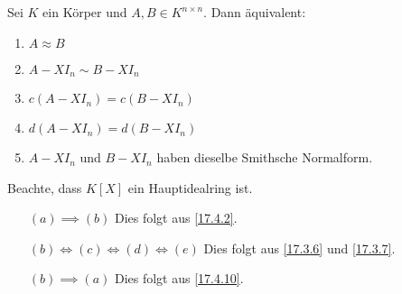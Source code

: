 \documentclass[../../main.tex]{subfiles}
\begin{document}
\begin{kor}\label{17.4.11}
    Sei $K$ ein Körper und $A,B\in K^{n\times n}$. Dann äquivalent:
    \begin{enumerate}[\normalfont(a)]
        \item $A\approx B$
        \item $A-XI_n\sim B-XI_n$
        \item $c(A-XI_n)=c(B-XI_n)$
        \item $d(A-XI_n)=d(B-XI_n)$
        \item $A-XI_n$ und $B-XI_n$ haben dieselbe Smithsche Normalform.
    \end{enumerate}
\end{kor}
\begin{cproof}
    Beachte, dass $K[X]$ ein Hauptidealring ist.
    \begin{itemize}
        \item[$(a)\implies(b)$] Dies folgt aus \ref{17.4.2}.
        \item[$(b)\Longleftrightarrow(c)\Longleftrightarrow(d)\Longleftrightarrow(e)$] Dies folgt aus \ref{17.3.6} und \ref{17.3.7}.
        \item[$(b)\implies(a)$] Dies folgt aus \ref{17.4.10}.
    \end{itemize}
\end{cproof}
\end{document}
